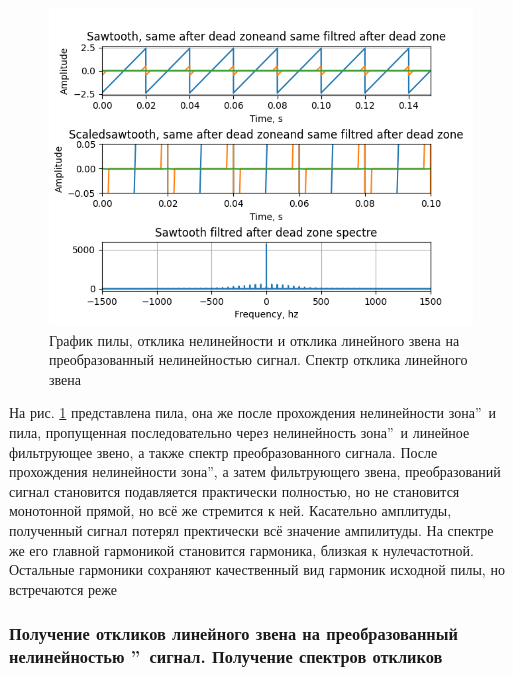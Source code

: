 \begin{figure}[H]
	\centering
	\includegraphics[width=0.95\linewidth]{body/images/sawtooth-after-filtred-dead-zone-and-its-spectre.png}
	\caption{График пилы, отклика нелинейности и отклика линейного звена на преобразованный
	нелинейностью сигнал. Спектр отклика линейного звена}
	\label{fig:27}
\end{figure}

На рис. \ref{fig:27} представлена пила, она же после прохождения
нелинейности  зона\textquotedblright\ и пила,
пропущенная последовательно через нелинейность
 зона\textquotedblright\ и 
линейное фильтрующее звено, а также спектр преобразованного сигнала.
После прохождения нелинейности  зона\textquotedblright, а
затем фильтрующего звена, преобразований сигнал становится подавляется практически
полностью, но не становится монотонной прямой, но всё же стремится к ней. Касательно
амплитуды, полученный сигнал потерял пректически всё значение ампилитуды. На спектре
же его главной гармоникой становится гармоника, близкая к нулечастотной. Остальные
гармоники сохраняют качественный вид гармоник исходной пилы, но встречаются реже

\subsubsection{Получение откликов линейного звена на преобразованный
нелинейностью \textquotedblright\ сигнал.
Получение спектров откликов}

